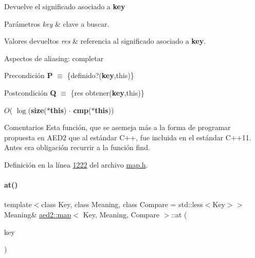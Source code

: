Devuelve el significado asociado a {\bfseries key} 


\begin{DoxyParams}{Parámetros}
{\em key} & clave a buscar. \\
\hline
\end{DoxyParams}

\begin{DoxyRetVals}{Valores devueltos}
{\em res} & referencia al significado asociado a {\bfseries key}.\\
\hline
\end{DoxyRetVals}
\begin{DoxyParagraph}{Aspectos de aliasing\+:}
completar
\end{DoxyParagraph}
\begin{DoxyPrecond}{Precondición}
{\bfseries P} $\equiv$ \{definido?({\bfseries key},this)\}
\end{DoxyPrecond}
\begin{DoxyPostcond}{Postcondición}
{\bfseries Q} $\equiv$ \{res  obtener({\bfseries key},this)\}
\end{DoxyPostcond}

\begin{DoxyDescription}
\item[Complejidad Temporal]$O$( $\log$({\bfseries size}({\bfseries $\ast$this}) $\cdot$ {\bfseries cmp}({\bfseries $\ast$this}))
\end{DoxyDescription}

\begin{DoxyRemark}{Comentarios}
Esta función, que se asemeja más a la forma de programar propuesta en A\+E\+D2 que al estándar C++, fue incluida en el estándar C++11. Antes era obligación recurrir a la función find. 
\end{DoxyRemark}


Definición en la línea \hyperlink{map_8h_source_l01222}{1222} del archivo \hyperlink{map_8h_source}{map.\+h}.

\mbox{\label{classaed2_1_1map_a6b21c09f59a83b6ee45432dcfa61f4a1_a6b21c09f59a83b6ee45432dcfa61f4a1}} 
\paragraph{\texorpdfstring{at()}{at()}\hspace{0.1cm}{\footnotesize\ttfamily [2/2]}}
{\footnotesize\ttfamily template$<$class Key, class Meaning, class Compare = std\+::less$<$\+Key$>$$>$ \\
Meaning\& \hyperlink{classaed2_1_1map}{aed2\+::map}$<$ Key, Meaning, Compare $>$\+::at (\begin{DoxyParamCaption}\item[{const Key \&}]{key }\end{DoxyParamCaption})\hspace{0.3cm}{\ttfamily [inline]}}

